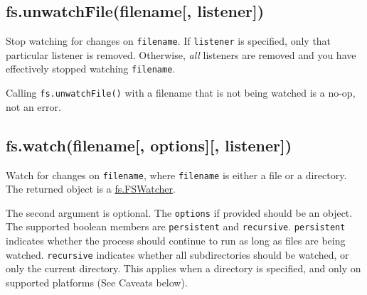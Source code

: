 \subsection{fs.unwatchFile(filename{[},
listener{]})}\label{fs.unwatchfilefilename-listener}

\begin{Shaded}
\begin{Highlighting}[]
 \NormalTok{- }  \NormalTok{, } 
\end{Highlighting}
\end{Shaded}

Stop watching for changes on \texttt{filename}. If \texttt{listener} is
specified, only that particular listener is removed. Otherwise,
\emph{all} listeners are removed and you have effectively stopped
watching \texttt{filename}.

Calling \texttt{fs.unwatchFile()} with a filename that is not being
watched is a no-op, not an error.

\subsection{fs.watch(filename{[}, options{]}{[},
listener{]})}\label{fs.watchfilename-options-listener}

\begin{Shaded}
\begin{Highlighting}[]
 \NormalTok{- }
\end{Highlighting}
\end{Shaded}

Watch for changes on \texttt{filename}, where \texttt{filename} is
either a file or a directory. The returned object is a
\hyperref[fsux5fclassux5ffsux5ffswatcher]{fs.FSWatcher}.

The second argument is optional. The \texttt{options} if provided should
be an object. The supported boolean members are \texttt{persistent} and
\texttt{recursive}. \texttt{persistent} indicates whether the process
should continue to run as long as files are being watched.
\texttt{recursive} indicates whether all subdirectories should be
watched, or only the current directory. This applies when a directory is
specified, and only on supported platforms (See Caveats below).

